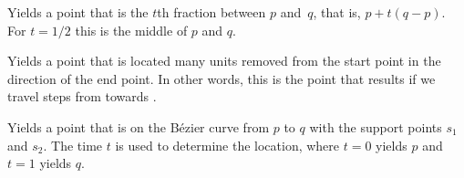 \begin{command}{\pgfpointlineattime{}}
  Yields a point that is the $t$th fraction between $p$
  and~$q$, that is, $p + t(q-p)$. For $t=1/2$ this is the middle of
  $p$ and $q$.

\begin{codeexample}[]
\end{codeexample}
\end{command}

\begin{command}{\pgfpointlineatdistance{}}
  Yields a point that is located  many units removed
  from the start point in the direction of the end point. In other
  words, this is the point that results if we travel 
  steps from  towards .
  \example
\begin{codeexample}[]
\end{codeexample}
\end{command}

\begin{command}{\pgfpointcurveattime{}}
  Yields a point that is on the Bézier curve from $p$ to $q$ with the
  support points $s_1$ and $s_2$. The time $t$ is used to determine
  the location, where $t=0$ yields $p$ and $t=1$ yields $q$.

\begin{codeexample}[]
\end{codeexample}
\end{command}

